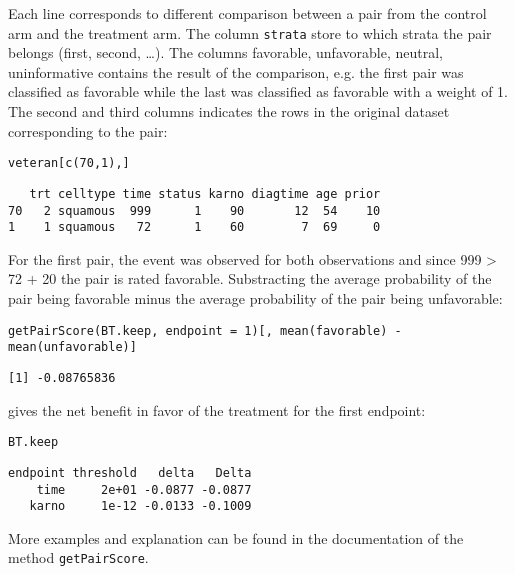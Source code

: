 \documentclass[12pt]{article}
\begin{document}
Each line corresponds to different comparison between a pair from the
control arm and the treatment arm. The column \texttt{strata} store to which
strata the pair belongs (first, second, \ldots{}). The columns favorable,
unfavorable, neutral, uninformative contains the result of the
comparison, e.g. the first pair was classified as favorable while the
last was classified as favorable with a weight of 1. The second and
third columns indicates the rows in the original dataset corresponding
to the pair:
\lstset{language=r,label= ,caption= ,captionpos=b,numbers=none}
\begin{lstlisting}
veteran[c(70,1),]
\end{lstlisting}

\begin{verbatim}
   trt celltype time status karno diagtime age prior
70   2 squamous  999      1    90       12  54    10
1    1 squamous   72      1    60        7  69     0
\end{verbatim}


For the first pair, the event was observed for both observations and
since 999 > 72 + 20 the pair is rated favorable. Substracting the
average probability of the pair being favorable minus the average
probability of the pair being unfavorable:
\lstset{language=r,label= ,caption= ,captionpos=b,numbers=none}
\begin{lstlisting}
getPairScore(BT.keep, endpoint = 1)[, mean(favorable) - mean(unfavorable)]
\end{lstlisting}

\begin{verbatim}
[1] -0.08765836
\end{verbatim}

gives the net benefit in favor of the treatment for the first
endpoint:
\lstset{language=r,label= ,caption= ,captionpos=b,numbers=none}
\begin{lstlisting}
BT.keep
\end{lstlisting}

\begin{verbatim}
endpoint threshold   delta   Delta
    time     2e+01 -0.0877 -0.0877
   karno     1e-12 -0.0133 -0.1009
\end{verbatim}

More examples and explanation can be found in the documentation of
the method \texttt{getPairScore}.
\end{document}
